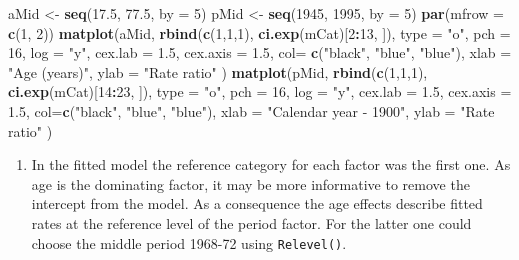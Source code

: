 \documentclass[
]{book}
\newenvironment{Shaded}{\begin{snugshade}}{\end{snugshade}}
\newcommand{\AttributeTok}[1]{\textcolor[rgb]{0.13,0.29,0.53}{#1}}
\newcommand{\DecValTok}[1]{\textcolor[rgb]{0.00,0.00,0.81}{#1}}
\newcommand{\FloatTok}[1]{\textcolor[rgb]{0.00,0.00,0.81}{#1}}
\newcommand{\FunctionTok}[1]{\textcolor[rgb]{0.13,0.29,0.53}{\textbf{#1}}}
\newcommand{\NormalTok}[1]{#1}
\newcommand{\OtherTok}[1]{\textcolor[rgb]{0.56,0.35,0.01}{#1}}
\newcommand{\SpecialCharTok}[1]{\textcolor[rgb]{0.81,0.36,0.00}{\textbf{#1}}}
\newcommand{\StringTok}[1]{\textcolor[rgb]{0.31,0.60,0.02}{#1}}
\providecommand{\tightlist}{%
  \setlength{\itemsep}{0pt}\setlength{\parskip}{0pt}}
\begin{document}
\begin{Shaded}
\begin{Highlighting}[]
\NormalTok{aMid }\OtherTok{\textless{}{-}} \FunctionTok{seq}\NormalTok{(}\FloatTok{17.5}\NormalTok{, }\FloatTok{77.5}\NormalTok{, }\AttributeTok{by =} \DecValTok{5}\NormalTok{)}
\NormalTok{pMid }\OtherTok{\textless{}{-}} \FunctionTok{seq}\NormalTok{(}\DecValTok{1945}\NormalTok{, }\DecValTok{1995}\NormalTok{, }\AttributeTok{by =} \DecValTok{5}\NormalTok{)}
\FunctionTok{par}\NormalTok{(}\AttributeTok{mfrow =} \FunctionTok{c}\NormalTok{(}\DecValTok{1}\NormalTok{, }\DecValTok{2}\NormalTok{))}
\FunctionTok{matplot}\NormalTok{(aMid, }\FunctionTok{rbind}\NormalTok{(}\FunctionTok{c}\NormalTok{(}\DecValTok{1}\NormalTok{,}\DecValTok{1}\NormalTok{,}\DecValTok{1}\NormalTok{), }\FunctionTok{ci.exp}\NormalTok{(mCat)[}\DecValTok{2}\SpecialCharTok{:}\DecValTok{13}\NormalTok{, ]), }\AttributeTok{type =} \StringTok{"o"}\NormalTok{, }\AttributeTok{pch =} \DecValTok{16}\NormalTok{,     }
   \AttributeTok{log =} \StringTok{"y"}\NormalTok{, }\AttributeTok{cex.lab =} \FloatTok{1.5}\NormalTok{, }\AttributeTok{cex.axis =} \FloatTok{1.5}\NormalTok{, }\AttributeTok{col=} \FunctionTok{c}\NormalTok{(}\StringTok{"black"}\NormalTok{, }\StringTok{"blue"}\NormalTok{, }\StringTok{"blue"}\NormalTok{),}
  \AttributeTok{xlab =} \StringTok{"Age (years)"}\NormalTok{, }\AttributeTok{ylab =} \StringTok{"Rate ratio"}\NormalTok{ )}
\FunctionTok{matplot}\NormalTok{(pMid, }\FunctionTok{rbind}\NormalTok{(}\FunctionTok{c}\NormalTok{(}\DecValTok{1}\NormalTok{,}\DecValTok{1}\NormalTok{,}\DecValTok{1}\NormalTok{), }\FunctionTok{ci.exp}\NormalTok{(mCat)[}\DecValTok{14}\SpecialCharTok{:}\DecValTok{23}\NormalTok{, ]), }\AttributeTok{type =} \StringTok{"o"}\NormalTok{, }\AttributeTok{pch =} \DecValTok{16}\NormalTok{,}
  \AttributeTok{log =} \StringTok{"y"}\NormalTok{, }\AttributeTok{cex.lab =} \FloatTok{1.5}\NormalTok{, }\AttributeTok{cex.axis =} \FloatTok{1.5}\NormalTok{, }\AttributeTok{col=}\FunctionTok{c}\NormalTok{(}\StringTok{"black"}\NormalTok{, }\StringTok{"blue"}\NormalTok{, }\StringTok{"blue"}\NormalTok{),}
  \AttributeTok{xlab =} \StringTok{"Calendar year {-} 1900"}\NormalTok{, }\AttributeTok{ylab =} \StringTok{"Rate ratio"}\NormalTok{ )}
\end{Highlighting}
\end{Shaded}

\begin{enumerate}
\def\labelenumi{\arabic{enumi}.}
\setcounter{enumi}{2}
\tightlist
\item
  In the fitted model the reference category for each factor was
  the first one. As age is the dominating factor, it may be more
  informative to remove the intercept from the model. As a
  consequence the age effects describe fitted rates at the reference
  level of the period factor. For the latter one could choose the
  middle period 1968-72 using \texttt{Relevel()}.
\end{enumerate}
\end{document}
